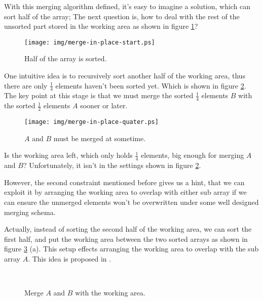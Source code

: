\documentclass[UTF8]{article}
\begin{document}
With this merging algorithm defined, it's easy to imagine a solution, which can sort
half of the array; The next question is, how to deal with the rest of the unsorted part
stored in the working area as shown in figure \ref{fig:merge-in-place-start}?

\begin{figure}[htbp]
 \centering
 \texttt{[image: img/merge-in-place-start.ps]}
 \caption{Half of the array is sorted.}
 \label{fig:merge-in-place-start}
\end{figure}

One intuitive idea is to recursively sort another half of the working area, thus there are
only $\frac{1}{4}$ elements haven't been sorted yet. Which is shown in figure \ref{fig:merge-in-place-quater}.
The key point at this stage is that we must merge the sorted $\frac{1}{4}$ elements $B$
with the sorted $\frac{1}{2}$ elements $A$ sooner or later.

\begin{figure}[htbp]
 \centering
 \texttt{[image: img/merge-in-place-quater.ps]}
 \caption{$A$ and $B$ must be merged at sometime.}
 \label{fig:merge-in-place-quater}
\end{figure}

Is the working area left, which only holds $\frac{1}{4}$ elements, big enough for merging
$A$ and $B$? Unfortunately, it isn't in the settings shown in figure \ref{fig:merge-in-place-quater}.

However, the second constraint mentioned before gives us a hint, that we can exploit
it by arranging the working area to overlap with either sub array if we can ensure
the unmerged elements won't be overwritten under some well designed merging schema.

Actually, instead of sorting the second half of the working area, we can sort the first
half, and put the working area between the two sorted arrays as shown in figure \ref{fig:merge-in-place-setup} (a).
This setup effects arranging the working area to overlap with the sub array $A$. This idea
is proposed in \cite{msort-in-place}.

\begin{figure}[htbp]
 \centering
  \\
 \caption{Merge $A$ and $B$ with the working area.}
 \label{fig:merge-in-place-setup}
\end{figure}
\end{document}
